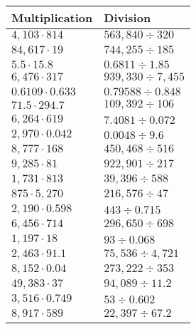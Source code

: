 \begin{longtable}[]{@{}ll@{}}
\toprule
Multiplication & Division\tabularnewline
\midrule
\endhead
\(4,103\cdot814\) & \(563,840÷320\)\tabularnewline
\(84,617\cdot19\) & \(744,255÷185\)\tabularnewline
\(5.5\cdot15.8\) & \(0.6811÷1.85\)\tabularnewline
\(6,476\cdot317\) & \(939,330÷7,455\)\tabularnewline
\(0.6109\cdot0.633\) & \(0.79588÷0.848\)\tabularnewline
\(71.5\cdot294.7\) & \(109,392÷106\)\tabularnewline
\(6,264\cdot619\) & \(7.4081÷0.072\)\tabularnewline
\(2,970\cdot0.042\) & \(0.0048÷9.6\)\tabularnewline
\(8,777\cdot168\) & \(450,468÷516\)\tabularnewline
\(9,285\cdot81\) & \(922,901÷217\)\tabularnewline
\(1,731\cdot813\) & \(39,396÷588\)\tabularnewline
\(875\cdot5,270\) & \(216,576÷47\)\tabularnewline
\(2,190\cdot0.598\) & \(443÷0.715\)\tabularnewline
\(6,456\cdot714\) & \(296,650÷698\)\tabularnewline
\(1,197\cdot18\) & \(93÷0.068\)\tabularnewline
\(2,463\cdot91.1\) & \(75,536÷4,721\)\tabularnewline
\(8,152\cdot0.04\) & \(273,222÷353\)\tabularnewline
\(49,383\cdot37\) & \(94,089÷11.2\)\tabularnewline
\(3,516\cdot0.749\) & \(53÷0.602\)\tabularnewline
\(8,917\cdot589\) & \(22,397÷67.2\)\tabularnewline
\bottomrule
\end{longtable}
